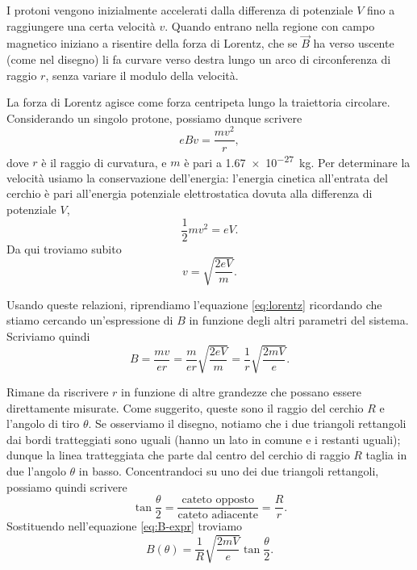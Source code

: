 \documentclass[10pt]{gulartcl}
\begin{document}
\begin{solution}
I protoni vengono inizialmente accelerati dalla differenza di potenziale
$V$ fino a raggiungere una certa velocità $v$. Quando entrano nella regione
con campo magnetico iniziano a risentire della forza di Lorentz, che se
$\vec{B}$ ha verso uscente (come nel disegno) li fa curvare verso destra
lungo un arco di circonferenza di raggio $r$, senza variare il modulo della
velocità.

La forza di Lorentz agisce come forza centripeta lungo la traiettoria
circolare. Considerando un singolo protone, possiamo dunque scrivere
\begin{equation}
    e B v = \frac{m v^2}{r},
    \label{eq:lorentz}
\end{equation}
dove $r$ è il raggio di curvatura, e $m$ è pari a \qty{1.67e-27}{kg}. Per
determinare la velocità usiamo la conservazione dell’energia: l’energia
cinetica all’entrata del cerchio è pari all’energia potenziale
elettrostatica dovuta alla differenza di potenziale $V$,
\begin{equation}
    \frac{1}{2} m v^2 = e V.
\end{equation}
Da qui troviamo subito
\begin{equation}
    v = \sqrt{\frac{2 e V}{m}}.
    \label{eq:v-expr}
\end{equation}

Usando queste relazioni, riprendiamo l’equazione \eqref{eq:lorentz}
ricordando che stiamo cercando un’espressione di $B$ in funzione degli
altri parametri del sistema. Scriviamo quindi
\begin{equation}
    B = \frac{m v}{e r} = \frac{m}{e r} \sqrt{\frac{2 e V}{m}}
      = \frac{1}{r} \sqrt{\frac{2 m V}{e}}.
    \label{eq:B-expr}
\end{equation}

Rimane da riscrivere $r$ in funzione di altre grandezze che possano essere
direttamente misurate. Come suggerito, queste sono il raggio del cerchio
$R$ e l’angolo di tiro $\theta$. Se osserviamo il disegno, notiamo che i
due triangoli rettangoli dai bordi tratteggiati sono uguali (hanno un lato
in comune e i restanti uguali); dunque la linea tratteggiata che parte dal
centro del cerchio di raggio $R$ taglia in due l’angolo $\theta$ in basso.
Concentrandoci su uno dei due triangoli rettangoli, possiamo quindi
scrivere
\begin{equation}
    \tan\frac{\theta}{2}
        = \frac{\text{cateto opposto}}{\text{cateto adiacente}} = \frac{R}{r}.
\end{equation}
Sostituendo nell’equazione \eqref{eq:B-expr} troviamo
\begin{equation}
    B(\theta) = \frac{1}{R} \sqrt{\frac{2 m V}{e}} \tan \frac{\theta}{2}. 
    \label{eq:B(theta)}
\end{equation}


\end{solution}
\end{document}
